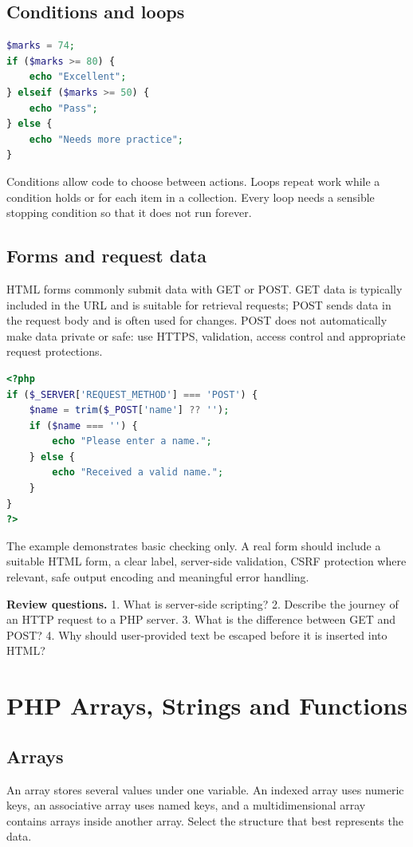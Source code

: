 \documentclass[11pt,openany,oneside]{book}
\newcommand{\exampractice}[1]{\begin{tcolorbox}[colback=LightGold,colframe=Gold,boxrule=.6pt,arc=1.2mm,left=2mm,right=2mm,top=1mm,bottom=1mm]\textbf{Review questions.} #1\end{tcolorbox}}
\begin{document}
\section{Conditions and loops}
\begin{lstlisting}[style=webcode,language=PHP]
$marks = 74;
if ($marks >= 80) {
    echo "Excellent";
} elseif ($marks >= 50) {
    echo "Pass";
} else {
    echo "Needs more practice";
}
\end{lstlisting}
Conditions allow code to choose between actions. Loops repeat work while a condition holds or for each item in a collection. Every loop needs a sensible stopping condition so that it does not run forever.

\section{Forms and request data}
HTML forms commonly submit data with GET or POST. GET data is typically included in the URL and is suitable for retrieval requests; POST sends data in the request body and is often used for changes. POST does not automatically make data private or safe: use HTTPS, validation, access control and appropriate request protections.

\begin{lstlisting}[style=webcode,language=PHP]
<?php
if ($_SERVER['REQUEST_METHOD'] === 'POST') {
    $name = trim($_POST['name'] ?? '');
    if ($name === '') {
        echo "Please enter a name.";
    } else {
        echo "Received a valid name.";
    }
}
?>
\end{lstlisting}
The example demonstrates basic checking only. A real form should include a suitable HTML form, a clear label, server-side validation, CSRF protection where relevant, safe output encoding and meaningful error handling.

\exampractice{1. What is server-side scripting? 2. Describe the journey of an HTTP request to a PHP server. 3. What is the difference between GET and POST? 4. Why should user-provided text be escaped before it is inserted into HTML?}

\chapter{PHP Arrays, Strings and Functions}
\section{Arrays}
An array stores several values under one variable. An indexed array uses numeric keys, an associative array uses named keys, and a multidimensional array contains arrays inside another array. Select the structure that best represents the data.
\end{document}
